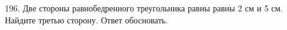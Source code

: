 196. Две стороны равнобедренного треугольника равны равны 2 см и 5 см. Найдите третью сторону. Ответ обосновать.\\

